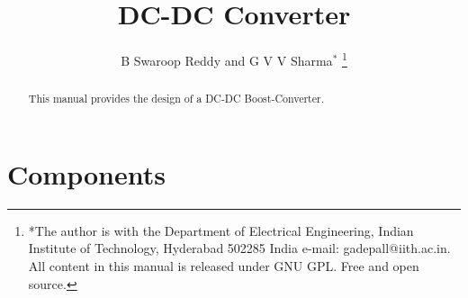 \documentclass[journal,12pt,twocolumn]{IEEEtran}
\begin{document}









\def\putbox#1#2#3{\makebox[0in][l]{\makebox[#1][l]{}\raisebox{\baselineskip}[0in][0in]{\raisebox{#2}[0in][0in]{#3}}}}
     \def\rightbox#1{\makebox[0in][r]{#1}}
     \def\centbox#1{\makebox[0in]{#1}}
     \def\topbox#1{\raisebox{-\baselineskip}[0in][0in]{#1}}
     \def\midbox#1{\raisebox{-0.5\baselineskip}[0in][0in]{#1}}

\vspace{3cm}

\title{ 
DC-DC Converter
}

\author{B Swaroop Reddy and  G V V Sharma$^{*}$%
	\thanks{*The author is with the Department
		of Electrical Engineering, Indian Institute of Technology, Hyderabad
		502285 India e-mail:  gadepall@iith.ac.in. All content in this manual is released under GNU GPL.  Free and open source.}
	
}	

\maketitle
\tableofcontents
\bigskip

\begin{abstract}
	
	This manual provides the design of a DC-DC Boost-Converter.
	
\end{abstract}
\section{Components}
\begin{table}[!h]
\centering

\caption{}
\label{table:components}
\end{table}
\end{document}
